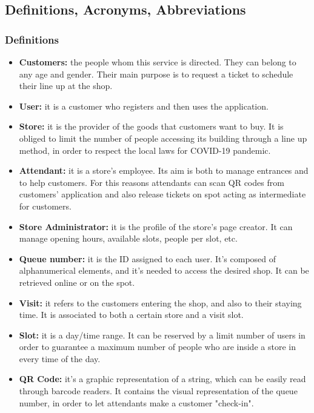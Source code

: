 \documentclass[table, 12pt]{article}
\begin{document}
\begin{flushleft}
    \subsection{Definitions, Acronyms, Abbreviations}
    \subsubsection{Definitions}
    \begin{itemize}
        \item \textbf{Customers:} the people whom this service is directed. They can belong to any age and gender. Their main purpose is to request a ticket to schedule their line up at the shop.
        \item \textbf{User:} it is a customer who registers and then uses the application.\label{User}
        \item \textbf{Store:} it is the provider of the goods that customers want to buy. It is obliged to limit the number of people accessing its building through a line up method, in order to respect the local laws for COVID-19 pandemic.
        \item \textbf{Attendant:} it is a store's employee. Its aim is both to manage entrances and to help customers. For this reasons attendants can scan QR codes from customers' application and also release tickets on spot acting as intermediate for customers.
        \item \textbf{Store Administrator:} it is the profile of the store's page creator. It can manage opening hours, available slots, people per slot, etc.
        \item \textbf{Queue number:} it is the ID assigned to each user. It's composed of alphanumerical elements, and it's needed to access the desired shop. It can be retrieved online or on the spot.
        \item \textbf{Visit:} it refers to the customers entering the shop, and also to their staying time. It is associated to both a certain store and a visit slot.
        \item \textbf{Slot:} it is a day/time range. It can be reserved by a limit number of users in order to guarantee a maximum number of people who are inside a store in every time of the day.
        \item \textbf{QR Code:} it's a graphic representation of a string, which can be easily read through barcode readers. It contains the visual representation of the queue number, in order to let attendants make a customer "check-in".\label{QR}

\end{itemize}
\end{flushleft}
\end{document}
